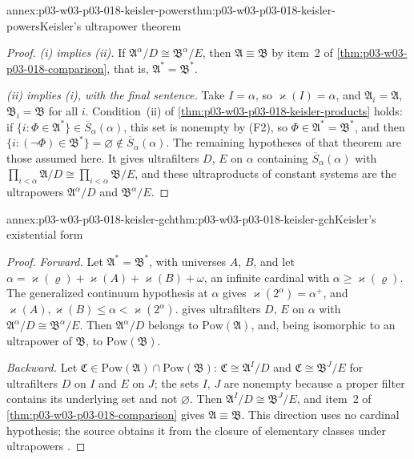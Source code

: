\begin{annexitem}{annex:p03-w03-p03-018-keisler-powers}{thm:p03-w03-p03-018-keisler-powers}{Keisler's ultrapower theorem}
\begin{proof}
\emph{(i) implies (ii).}  If \(\mathfrak A^\alpha/D\cong\mathfrak
B^\alpha/E\), then \(\mathfrak A\equiv\mathfrak B\) by item~2 of
\cref{thm:p03-w03-p03-018-comparison}, that is,
\(\mathfrak A^*=\mathfrak B^*\).

\emph{(ii) implies (i), with the final sentence.}  Take \(I=\alpha\), so
\(\varkappa(I)=\alpha\), and \(\mathfrak A_i=\mathfrak A\),
\(\mathfrak B_i=\mathfrak B\) for all \(i\).  Condition~(ii) of
\cref{thm:p03-w03-p03-018-keisler-products} holds: if
\(\{i:\Phi\in\mathfrak A^*\}\in\overline S_\alpha(\alpha)\), this set is
nonempty by (F2), so \(\Phi\in\mathfrak A^*=\mathfrak B^*\), and then
\(\{i:(\neg\Phi)\in\mathfrak B^*\}=\varnothing\notin\overline
S_\alpha(\alpha)\).  The remaining hypotheses of that theorem are those
assumed here.  It gives ultrafilters \(D\), \(E\) on \(\alpha\) containing
\(\overline S_\alpha(\alpha)\) with
\(\prod_{i<\alpha}\mathfrak A/D\cong\prod_{i<\alpha}\mathfrak B/E\), and these
ultraproducts of constant systems are the ultrapowers
\(\mathfrak A^\alpha/D\) and \(\mathfrak B^\alpha/E\).
\end{proof}
\end{annexitem}

\begin{annexitem}{annex:p03-w03-p03-018-keisler-gch}{thm:p03-w03-p03-018-keisler-gch}{Keisler's existential form}
\begin{proof}
\emph{Forward.}  Let \(\mathfrak A^*=\mathfrak B^*\), with universes \(A\),
\(B\), and let \(\alpha=\varkappa(\varrho)+\varkappa(A)+\varkappa(B)+\omega\),
an infinite cardinal with \(\alpha\ge\varkappa(\varrho)\).  The generalized
continuum hypothesis at \(\alpha\) gives \(\varkappa(2^\alpha)=\alpha^+\), and
\(\varkappa(A),\varkappa(B)\le\alpha<\varkappa(2^\alpha)\).
 gives ultrafilters \(D\), \(E\) on
\(\alpha\) with \(\mathfrak A^\alpha/D\cong\mathfrak B^\alpha/E\).  Then
\(\mathfrak A^\alpha/D\) belongs to \(\mathrm{Pow}(\mathfrak A)\), and, being
isomorphic to an ultrapower of \(\mathfrak B\), to
\(\mathrm{Pow}(\mathfrak B)\).

\emph{Backward.}  Let \(\mathfrak C\in\mathrm{Pow}(\mathfrak A)\cap
\mathrm{Pow}(\mathfrak B)\): \(\mathfrak C\cong\mathfrak A^I/D\) and
\(\mathfrak C\cong\mathfrak B^J/E\) for ultrafilters \(D\) on \(I\) and \(E\)
on \(J\); the sets \(I\), \(J\) are nonempty because a proper filter contains
its underlying set and not \(\varnothing\).  Then
\(\mathfrak A^I/D\cong\mathfrak B^J/E\), and item~2 of
\cref{thm:p03-w03-p03-018-comparison} gives \(\mathfrak A\equiv\mathfrak B\).
This direction uses no cardinal hypothesis; the source obtains it from the
closure of elementary classes under ultrapowers
\cite[487]{Keisler1961ElementaryClasses}.
\end{proof}
\end{annexitem}

